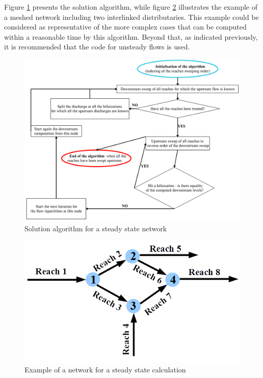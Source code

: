 Figure \ref{fig:AlgSP} presents the solution algorithm, while figure \ref{fig:ExSP} illustrates the example of a meshed network including two interlinked distributaries. This example could be considered as representative of the more complex cases that can be computed within a reasonable time by this algorithm. Beyond that, as indicated previously, it is recommended that the \REZO{} code for unsteady flows is used.

\begin{figure}[H]
 \begin{center}
  \includegraphics[width=\textwidth]{Figures/Algorithm_SARAP.png}
  \caption{Solution algorithm for a steady state network}
  \label{fig:AlgSP}
 \end{center}
\end{figure}

\begin{figure}[H]
 \begin{center}
  \includegraphics[width=\textwidth]{Figures/Ex_Res_SARAP.png}
  \caption{Example of a network for a steady state calculation}
  \label{fig:ExSP}
 \end{center}
\end{figure}

